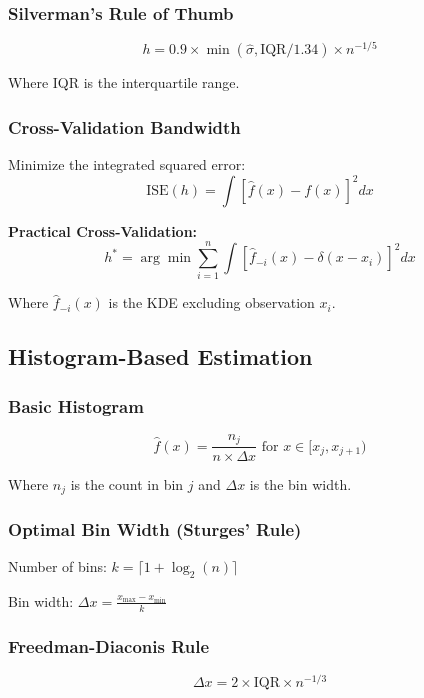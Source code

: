 \documentclass[12pt, xcolor=dvipsnames,svgnames,x11names]{article}
\begin{document}
\subsubsection{Silverman's Rule of Thumb}
\begin{equation}
h = 0.9 \times \min(\hat{\sigma}, \text{IQR}/1.34) \times n^{-1/5}
\end{equation}

Where IQR is the interquartile range.

\subsubsection{Cross-Validation Bandwidth}
Minimize the integrated squared error:
\begin{equation}
\text{ISE}(h) = \int[\hat{f}(x) - f(x)]^2 dx
\end{equation}

\textbf{Practical Cross-Validation:}
\begin{equation}
h^* = \arg\min \sum_{i=1}^n \int[\hat{f}_{-i}(x) - \delta(x - x_i)]^2 dx
\end{equation}

Where $\hat{f}_{-i}(x)$ is the KDE excluding observation $x_i$.

\subsection{Histogram-Based Estimation}

\subsubsection{Basic Histogram}
\begin{equation}
\hat{f}(x) = \frac{n_j}{n \times \Delta x} \text{ for } x \in [x_j, x_{j+1})
\end{equation}

Where $n_j$ is the count in bin $j$ and $\Delta x$ is the bin width.

\subsubsection{Optimal Bin Width (Sturges' Rule)}
Number of bins: $k = \lceil 1 + \log_2(n) \rceil$

Bin width: $\Delta x = \frac{x_{\max} - x_{\min}}{k}$

\subsubsection{Freedman-Diaconis Rule}
\begin{equation}
\Delta x = 2 \times \text{IQR} \times n^{-1/3}
\end{equation}
\end{document}
